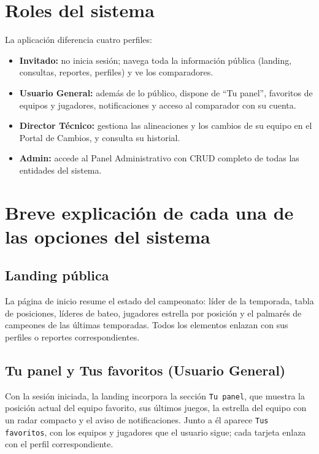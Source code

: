 \documentclass{report}
\begin{document}
    \section*{Roles del sistema}
    La aplicación diferencia cuatro perfiles:
    \begin{itemize}
        \item \textbf{Invitado:} no inicia sesión; navega toda la información pública (landing, consultas,
        reportes, perfiles) y ve los comparadores.
        \item \textbf{Usuario General:} además de lo público, dispone de ``Tu panel'', favoritos de
        equipos y jugadores, notificaciones y acceso al comparador con su cuenta.
        \item \textbf{Director Técnico:} gestiona las alineaciones y los cambios de su equipo en el
        Portal de Cambios, y consulta su historial.
        \item \textbf{Admin:} accede al Panel Administrativo con CRUD completo de todas las entidades del
        sistema.
    \end{itemize}

    \section*{Breve explicación de cada una de las opciones del sistema}

    \subsection*{Landing pública}
    La página de inicio resume el estado del campeonato: líder de la temporada, tabla de posiciones,
    líderes de bateo, jugadores estrella por posición y el palmarés de campeones de las últimas temporadas.
    Todos los elementos enlazan con sus perfiles o reportes correspondientes.

    \subsection*{Tu panel y Tus favoritos (Usuario General)}
    Con la sesión iniciada, la landing incorpora la sección \texttt{Tu panel}, que muestra la posición
    actual del equipo favorito, sus últimos juegos, la estrella del equipo con un radar compacto y el
    aviso de notificaciones. Junto a él aparece \texttt{Tus favoritos}, con los equipos y jugadores que
    el usuario sigue; cada tarjeta enlaza con el perfil correspondiente.
\end{document}
